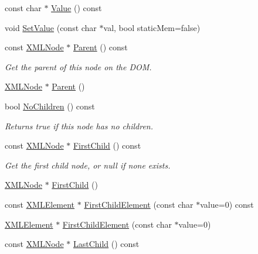 \begin{DoxyCompactItemize}
\item 
const char $\ast$ \hyperlink{classtinyxml2_1_1_x_m_l_node_a7682be117e3b2b4ebfd517c1acaaadbf}{Value} () const 
\item 
void \hyperlink{classtinyxml2_1_1_x_m_l_node_a09dd68cf9eae137579f6e50f36487513}{Set\-Value} (const char $\ast$val, bool static\-Mem=false)
\item 
const \hyperlink{classtinyxml2_1_1_x_m_l_node}{X\-M\-L\-Node} $\ast$ \hyperlink{classtinyxml2_1_1_x_m_l_node_a4e39bdcf9bfafa55d04857ece6aaf64e}{Parent} () const 
\begin{DoxyCompactList}\small\item\em Get the parent of this node on the D\-O\-M. \end{DoxyCompactList}\item 
\hyperlink{classtinyxml2_1_1_x_m_l_node}{X\-M\-L\-Node} $\ast$ \hyperlink{classtinyxml2_1_1_x_m_l_node_a76029693a5a54fbb721a41d7a0ca8a97}{Parent} ()
\item 
bool \hyperlink{classtinyxml2_1_1_x_m_l_node_a96afe34a9ccd0ed4c0cff32beb42cc6c}{No\-Children} () const 
\begin{DoxyCompactList}\small\item\em Returns true if this node has no children. \end{DoxyCompactList}\item 
const \hyperlink{classtinyxml2_1_1_x_m_l_node}{X\-M\-L\-Node} $\ast$ \hyperlink{classtinyxml2_1_1_x_m_l_node_a60e923d13d7dc01f45ab90a2f948b02a}{First\-Child} () const 
\begin{DoxyCompactList}\small\item\em Get the first child node, or null if none exists. \end{DoxyCompactList}\item 
\hyperlink{classtinyxml2_1_1_x_m_l_node}{X\-M\-L\-Node} $\ast$ \hyperlink{classtinyxml2_1_1_x_m_l_node_a2d6c70c475146b48bc93a7fafdeff5e0}{First\-Child} ()
\item 
const \hyperlink{classtinyxml2_1_1_x_m_l_element}{X\-M\-L\-Element} $\ast$ \hyperlink{classtinyxml2_1_1_x_m_l_node_a20f48e99b03e9c17487944f229bee130}{First\-Child\-Element} (const char $\ast$value=0) const 
\item 
\hyperlink{classtinyxml2_1_1_x_m_l_element}{X\-M\-L\-Element} $\ast$ \hyperlink{classtinyxml2_1_1_x_m_l_node_a7614c3b4eea1ff11b2aa90b0f92f6dba}{First\-Child\-Element} (const char $\ast$value=0)
\item 
const \hyperlink{classtinyxml2_1_1_x_m_l_node}{X\-M\-L\-Node} $\ast$ \hyperlink{classtinyxml2_1_1_x_m_l_node_a6088246532b02895beb0e6fa561a7f3b}{Last\-Child} () const 

\end{DoxyCompactItemize}
